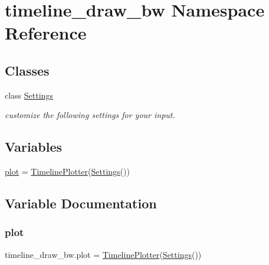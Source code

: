 \hypertarget{namespacetimeline__draw__bw}{}\section{timeline\+\_\+draw\+\_\+bw Namespace Reference}
\label{namespacetimeline__draw__bw}
\subsection*{Classes}
\begin{DoxyCompactItemize}
\item 
class \hyperlink{classtimeline__draw__bw_1_1Settings}{Settings}
\begin{DoxyCompactList}\small\item\em customize the following settings for your input. \end{DoxyCompactList}\end{DoxyCompactItemize}
\subsection*{Variables}
\begin{DoxyCompactItemize}
\item 
\hyperlink{namespacetimeline__draw__bw_a32f2643f000811c183bf1ce20bd64973}{plot} = \hyperlink{classtimeline__plotter_1_1TimelinePlotter}{Timeline\+Plotter}(\hyperlink{classtimeline__draw__bw_1_1Settings}{Settings}())
\end{DoxyCompactItemize}


\subsection{Variable Documentation}
\mbox{\label{namespacetimeline__draw__bw_a32f2643f000811c183bf1ce20bd64973}} 
\subsubsection{\texorpdfstring{plot}{plot}}
{\footnotesize\ttfamily timeline\+\_\+draw\+\_\+bw.\+plot = \hyperlink{classtimeline__plotter_1_1TimelinePlotter}{Timeline\+Plotter}(\hyperlink{classtimeline__draw__bw_1_1Settings}{Settings}())}

